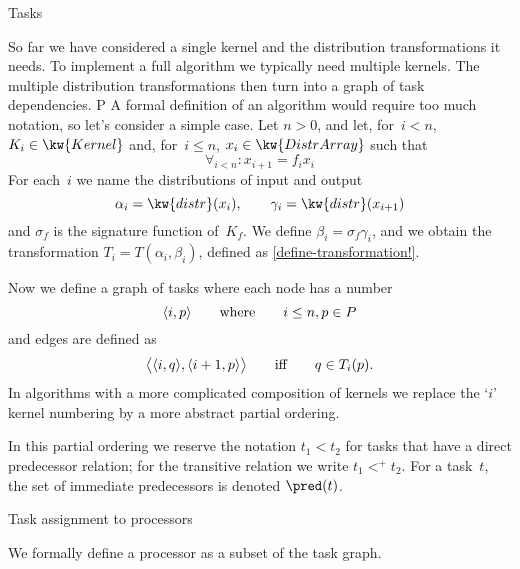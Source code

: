 
 {Tasks}
\label{sec:taskdef}

So far we have considered a single kernel and the distribution
transformations it needs. To implement a full algorithm we 
typically need multiple kernels. The multiple distribution
transformations then turn into a graph of task dependencies.
%
    {\equiv {}\times P}
%
A formal definition of an algorithm would require too much
notation, so let's consider a simple case.
Let $n>0$, and let, for~$i<n$, $K_i\in\kw{Kernel}$ and,
for~$i\leq n$, $x_i\in\kw{DistrArray}$ such that
\[ \forall_{i<n}\colon x_{i+1}=f_ix_i \]
For each~$i$ we name the distributions of input and output
\[ \alpha_i=\kw{distr}(x_i),\qquad \gamma_i=\kw{distr}(x_{i+1}) \]
and $\sigma_f$ is the signature function of~$K_f$. We define $\beta_i=\sigma_f\gamma_i$,
and we obtain the transformation $T_i=T(\alpha_i,\beta_i)$,
defined as \ref{define-transformation!}.

Now we define a graph of tasks where each node has a number
\begin{equation}
\langle i,p\rangle\qquad\hbox{where}\qquad i\leq n,p\in P
\end{equation}
and edges are defined as
\[ \bigl\langle \langle i,q\rangle,\langle i+1,p\rangle \bigr\rangle 
   \qquad\hbox{iff}\qquad
   q\in T_i(p).
\]
In algorithms with a more complicated composition of kernels
we replace the `$i$' kernel numbering by a more abstract
partial ordering.

In this partial ordering we reserve the notation $t_1<t_2$ for 
tasks that have a direct predecessor relation; for the transitive
relation we write $t_1\mathrel{<^+}t_2$. For a task~$t$, the set
of immediate predecessors is denoted $\pred(t)$.

 {Task assignment to processors}
\label{sec:taskproc}

We formally define a processor as a subset of the task graph.


